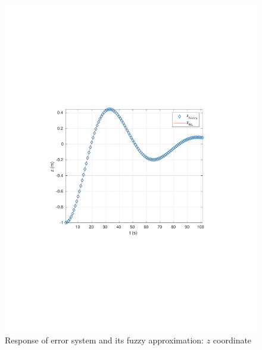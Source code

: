 \begin{frame}
	\begin{figure}[!htb]
		\centering
		\includegraphics[scale=.7,trim={3.5cm 8cm 4cm 8cm},clip]{figuras/OL/z.pdf}
		\caption{Response of error system and its fuzzy approximation: $z$ coordinate} \label{fig:OL_z}
	\end{figure} 
\end{frame}


